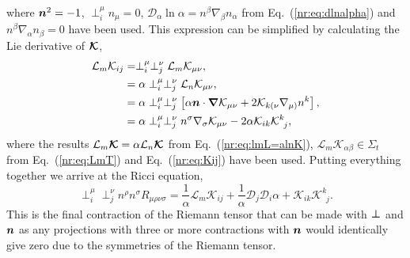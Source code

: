 where $\boldsymbol{n}^2 =-1$, $\perp_i^\mu n_\mu =0$, $\mathcal{D}_\alpha \ln \alpha = n^\beta \nabla_\beta n_\alpha$ from Eq.~(\ref{nr:eq:dlnalpha}) and $n^\beta \nabla_\alpha n_\beta =0$ have been used. This expression can be simplified by calculating the Lie derivative of $\boldsymbol{\mathcal{K}}$,
\begin{align}
 \mathcal{L}_m \mathcal{K}_{ij}  &= \perp^\mu_i\perp^\nu_j\mathcal{L}_m \mathcal{K}_{\mu\nu} ,\\ &= \alpha\perp^\mu_i\perp^\nu_j\mathcal{L}_n \mathcal{K}_{\mu\nu} ,\\
 & =\alpha \perp^\mu_i\perp^\nu_j\left[ \alpha \boldsymbol{n}\cdot \boldsymbol{\nabla} \mathcal{K}_{\mu\nu} + 2 \mathcal{K}_{k(\nu}\nabla_{\mu)}n^k\right], \\
&= \alpha \perp^\mu_i\perp^\nu_j n^\sigma \nabla_\sigma \mathcal{K}_{\mu\nu} - 2\alpha\mathcal{K}_{ik}\mathcal{K}^k_{\,\,\,j},
 \end{align}
where the results $\mathcal{L}_m \boldsymbol{\mathcal{K}} = \alpha \mathcal{L}_n \boldsymbol{\mathcal{K}}$ from Eq.~(\ref{nr:eq:lmL=alnK}), $\mathcal{L}_m\mathcal{K}_{\alpha\beta} \in \Sigma_t$ from Eq.~(\ref{nr:eq:LmT}) and Eq.~(\ref{nr:eq:Kij}) have been used. Putting everything together we arrive at the Ricci equation,
\begin{equation}\perp^\mu_{i} \perp^\nu_j n^\rho n^\sigma R_{\mu\rho\nu\sigma} = \frac{1}{\alpha}\mathcal{L}_m \mathcal{K}_{ij} +\frac{1}{\alpha}\mathcal{D}_j\mathcal{D}_i \alpha +\mathcal{K}_{ik}\mathcal{K}^k_{\,\,\,j}.  \label{nr:eq:riccieq}\end{equation}
This is the final contraction of the Riemann tensor that can be made with $\boldsymbol{\perp}$ and $\boldsymbol{n}$ as any projections with three or more contractions with $\boldsymbol{n}$ would identically give zero due to the symmetries of the Riemann tensor.


